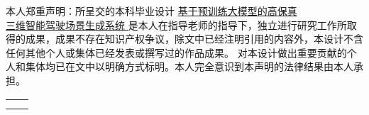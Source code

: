
\begin{declarationzh}
		
本人郑重声明：所呈交的本科毕业设计 \uline{ 基于预训练大模型的高保真\\三维智能驾驶场景生成系统 } 是本人在指导老师的指导下，独立进行研究工作所取得的成果，成果不存在知识产权争议，除文中已经注明引用的内容外，本设计不含任何其他个人或集体已经发表或撰写过的作品成果。
对本设计做出重要贡献的个人和集体均已在文中以明确方式标明。本人完全意识到本声明的法律结果由本人承担。
	
	\vspace{30pt}
	\begin{tabular}{ll}
		\hspace{240pt} \makebox[4em][s]{作者签名：} & \underline{\makebox[100pt][c]{ 郑睿翔 }} \\
		\hspace{240pt} \makebox[4em][s]{日\qquad 期:}	 &
		\underline{\makebox[100pt][c]{\qquad 2025年\quad 4月\quad  28 日 }} \\
	\end{tabular}

	
	
\end{declarationzh}